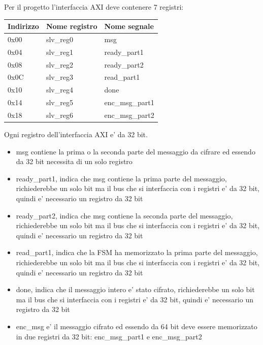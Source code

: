 \documentclass[a4paper]{article}
\begin{document}
Per il progetto l'interfaccia AXI deve contenere 7 registri:
\begin{table}[!ht]
    \centering
    \begin{tabular}{|l|l|l|}
    \hline
        Indirizzo & Nome registro & Nome segnale \\ \hline
        0x00 & slv\_reg0 & msg \\ \hline
        0x04 & slv\_reg1 & ready\_part1 \\ \hline
        0x08 & slv\_reg2 & ready\_part2 \\ \hline
        0x0C & slv\_reg3 & read\_part1 \\ \hline
        0x10 & slv\_reg4 & done \\ \hline
        0x14 & slv\_reg5 & enc\_msg\_part1 \\ \hline
        0x18 & slv\_reg6 & enc\_msg\_part2 \\ \hline
    \end{tabular}
\end{table}

Ogni registro dell'interfaccia AXI e' da 32 bit.

\begin{itemize}
    \item msg contiene la prima o la seconda parte del messaggio da cifrare ed essendo da 32 bit necessita di un solo registro
    \item ready\_part1, indica che msg contiene la prima parte del messaggio, richiederebbe un solo bit ma il bus che si interfaccia con i registri e' da 32 bit, quindi e' necessario un registro da 32 bit
    \item ready\_part2, indica che msg contiene la seconda parte del messaggio, richiederebbe un solo bit ma il bus che si interfaccia con i registri e' da 32 bit, quindi e' necessario un registro da 32 bit
    \item read\_part1, indica che la FSM ha memorizzato la prima parte del messaggio, richiederebbe un solo bit ma il bus che si interfaccia con i registri e' da 32 bit, quindi e' necessario un registro da 32 bit
    \item done, indica che il messaggio intero e' stato cifrato, richiederebbe un solo bit ma il bus che si interfaccia con i registri e' da 32 bit, quindi e' necessario un registro da 32 bit
    \item enc\_msg e' il messaggio cifrato ed essendo da 64 bit deve essere memorizzato in due registri da 32 bit: enc\_msg\_part1 e enc\_msg\_part2
\end{itemize}
\end{document}
